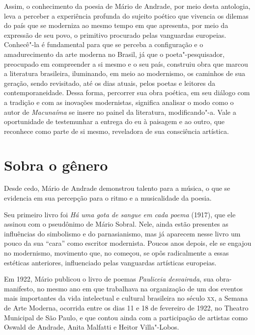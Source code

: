 Assim, o conhecimento da poesia de Mário de Andrade, por meio desta
antologia, leva a perceber a experiência profunda do sujeito poético que
vivencia os dilemas do país que se moderniza ao mesmo tempo em que
apresenta, por meio da expressão de seu povo, o primitivo procurado
pelas vanguardas europeias. Conhecê"-la é fundamental para que se perceba
a configuração e o amadurecimento da arte moderna no Brasil, já que o
poeta"-pesquisador, preocupado em compreender a si mesmo e o seu país,
construiu obra que marcou a literatura brasileira, iluminando, em meio
ao modernismo, os caminhos de sua geração, sendo revisitado, até os dias
atuais, pelos poetas e leitores da contemporaneidade. Dessa forma,
percorrer sua obra poética, em seu diálogo com a tradição e com as
inovações modernistas, significa analisar o modo como o autor de
\emph{Macunaíma} se insere no painel da literatura, modificando"-a. Vale
a oportunidade de testemunhar a entrega do eu à paisagem e ao outro, que
reconhece como parte de si mesmo, reveladora de sua consciência
artística.


\section{Sobra o gênero}

Desde cedo, Mário de Andrade demonstrou talento para a música, o que se evidencia em sua percepção para o ritmo e a musicalidade da poesia.

Seu primeiro livro foi \emph{Há uma gota de sangue em cada poema}
(1917), que ele assinou com o pseudônimo de Mário Sobral. Nele, ainda
estão presentes as influências do simbolismo e do parnasianismo, mas já
aparecem nesse livro um pouco da sua ``cara'' como escritor modernista.
Poucos anos depois, ele se engajou no modernismo, movimento que, no
começou, se opôs radicalmente a essas estéticas anteriores, influenciado
pelas vanguardas artísticas europeias.

Em 1922, Mário publicou o livro de poemas \emph{Pauliceia desvairada},
sua obra-manifesto, no mesmo ano em que trabalhava na organização de um
dos eventos mais importantes da vida intelectual e cultural brasileira
no século \textsc{xx}, a Semana de Arte Moderna, ocorrida entre os dias 11 e 18
de fevereiro de 1922, no Theatro Municipal de São Paulo, e que contou
ainda com a participação de artistas como Oswald de Andrade, Anita
Malfatti e Heitor Villa"-Lobos.

